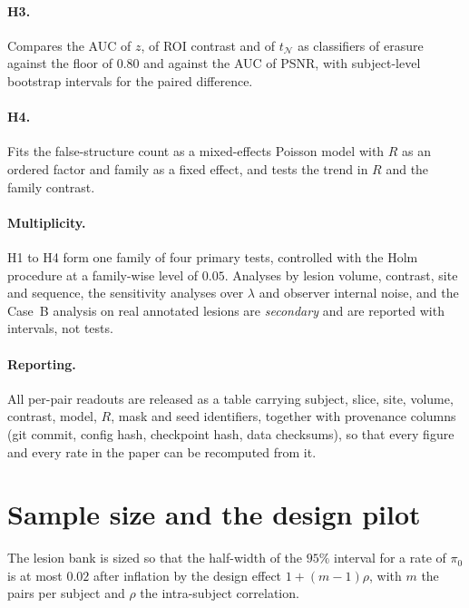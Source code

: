 \documentclass[11pt,a4paper]{article}
\begin{document}
\paragraph{H3.} Compares the AUC of $z$, of ROI contrast and of
$t_{\mathcal{N}}$ as classifiers of erasure against the floor of $0.80$ and
against the AUC of PSNR, with subject-level bootstrap intervals for the paired
difference.

\paragraph{H4.} Fits the false-structure count as a mixed-effects Poisson
model with $R$ as an ordered factor and family as a fixed effect, and tests
the trend in $R$ and the family contrast.

\paragraph{Multiplicity.} H1 to H4 form one family of four primary tests,
controlled with the Holm procedure at a family-wise level of $0.05$. Analyses
by lesion volume, contrast, site and sequence, the sensitivity analyses over
$\lambda$ and observer internal noise, and the Case~B analysis on real
annotated lesions are \emph{secondary} and are reported with intervals, not
tests.

\paragraph{Reporting.} All per-pair readouts are released as a table carrying
subject, slice, site, volume, contrast, model, $R$, mask and seed identifiers,
together with provenance columns (git commit, config hash, checkpoint hash,
data checksums), so that every figure and every rate in the paper can be
recomputed from it.

\section{Sample size and the design pilot}
\label{sec:samplesize}

The lesion bank is sized so that the half-width of the $95\%$ interval for a
rate of $\pi_0$ is at most $0.02$ after inflation by the design effect
$1 + (m-1)\rho$, with $m$ the pairs per subject and $\rho$ the intra-subject
correlation.
\end{document}
